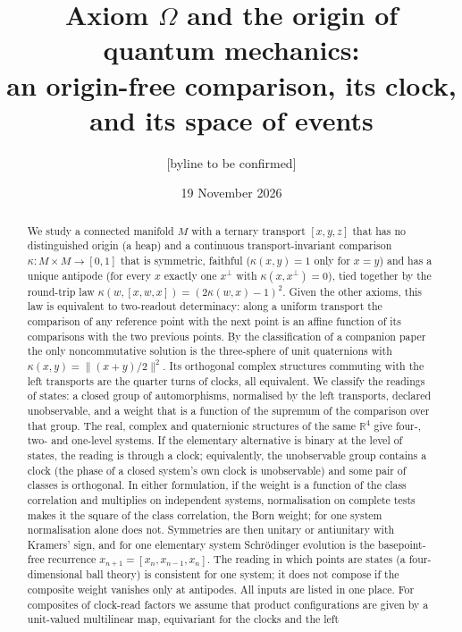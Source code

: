 \documentclass[aps,pra,onecolumn,superscriptaddress,nofootinbib,10pt]{revtex4-2}
\theoremstyle{definition}
\theoremstyle{remark}
\newcommand{\R}{\mathbb{R}}
\newcommand{\hp}[3]{[#1,#2,#3]}
\begin{document}
\title{Axiom $\Omega$ and the origin of quantum mechanics:\\ an origin-free comparison, its clock, and its space of events}
\author{[byline to be confirmed]}
\date{19 November 2026}

\begin{abstract}
We study a connected manifold $M$ with a ternary transport $\hp{x}{y}{z}$ that has no distinguished
origin (a heap) and a continuous transport-invariant comparison $\kappa\colon M\times M\to[0,1]$ that is symmetric,
faithful ($\kappa(x,y)=1$ only for $x=y$) and has a unique antipode (for every $x$ exactly one $x^\perp$ with
$\kappa(x,x^\perp)=0$), tied together by the round-trip law $\kappa(w,\hp{x}{w}{x})=(2\kappa(w,x)-1)^2$.  Given the other axioms,
this law is equivalent to two-readout determinacy: along a uniform transport the comparison of any
reference point with the next point is an affine function of its comparisons with the two previous
points.  By the classification of a companion paper the only noncommutative solution is the
three-sphere of unit quaternions with $\kappa(x,y)=\lVert(x+y)/2\rVert^2$.  Its orthogonal complex
structures commuting with the left transports are the quarter turns of clocks, all equivalent.  We
classify the readings of states: a closed group of automorphisms, normalised by the left transports,
declared unobservable, and a weight that is a function of the supremum of the comparison over that
group.  The real, complex and quaternionic structures of the same $\R^4$ give four-, two- and one-level
systems.  If the elementary alternative is binary at the level of states, the reading is through a clock;
equivalently, the unobservable group contains a clock (the phase of a closed system's own clock is
unobservable) and some pair of classes is orthogonal.  In either formulation, if the weight is a function of the class correlation and multiplies on
independent systems, normalisation on complete tests makes it the square of the class correlation, the
Born weight; for one system normalisation alone does not.  Symmetries are then unitary or antiunitary with
Kramers' sign, and for one elementary system Schr\"odinger evolution is the basepoint-free recurrence
$x_{n+1}=\hp{x_n}{x_{n-1}}{x_n}$.  The reading in which points are states (a four-dimensional ball
theory) is consistent for one system; it does not compose if the composite weight vanishes only at
antipodes.  All inputs are listed in one place.  For composites of clock-read factors we assume that product
configurations are given by a unit-valued multilinear map, equivariant for the clocks and the left

\end{abstract}
\end{document}

